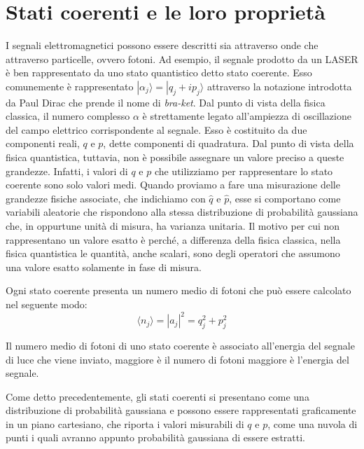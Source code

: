 \section{Stati coerenti e le loro propriet\`a}\label{se:sezione1-1}
I segnali elettromagnetici possono essere descritti sia attraverso onde che attraverso particelle, ovvero fotoni. Ad esempio, il segnale prodotto da un LASER è ben rappresentato da uno stato quantistico detto stato coerente. Esso comunemente \`e rappresentato $|\alpha_j \rangle = |q_j + ip_j \rangle $ attraverso la notazione introdotta da Paul Dirac che prende il nome di \textit{bra-ket}. Dal punto di vista della fisica classica, il numero complesso $\alpha$ è strettamente legato all'ampiezza di oscillazione del campo elettrico corrispondente al segnale. Esso è costituito da due componenti reali, $q$ e $p$, dette componenti di quadratura. Dal punto di vista della fisica quantistica, tuttavia, non è possibile assegnare un valore preciso a queste grandezze. Infatti, i valori di $q$ e $p$ che utilizziamo per rappresentare lo stato coerente sono solo valori medi. Quando proviamo a fare una misurazione delle grandezze fisiche associate, che indichiamo con $\hat q$ e $\hat p$, esse si comportano come variabili aleatorie che rispondono alla stessa distribuzione di probabilit\`a gaussiana che, in oppurtune unit\`a di misura, ha varianza unitaria. Il motivo per cui non rappresentano un valore esatto \`e perch\'e, a differenza della fisica classica, nella fisica quantistica le quantit\`a, anche scalari, sono degli operatori che assumono una valore esatto solamente in fase di misura.

Ogni stato coerente presenta un numero medio di fotoni che pu\`o essere calcolato nel seguente modo:
\begin{equation}
\langle n_j \rangle = |a_j|^2 = q_j^2 + p_j^2 
\end{equation}

Il numero medio di fotoni di uno stato coerente \`e associato all'energia del segnale di luce che viene inviato, maggiore \`e il numero di fotoni maggiore \`e l'energia del segnale.

Come detto precedentemente, gli stati coerenti si presentano come una distribuzione di probabilit\`a gaussiana e possono essere rappresentati graficamente in un piano cartesiano, che riporta i valori misurabili di $q$ e $p$, come una nuvola di punti i quali avranno appunto probabilit\`a gaussiana di essere estratti.


